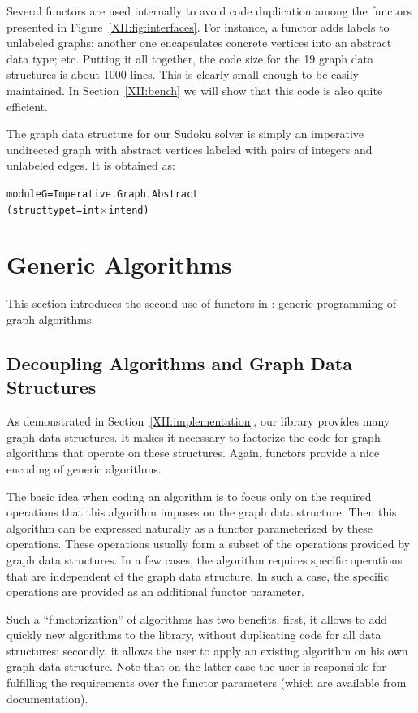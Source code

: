 Several functors are used internally to avoid code duplication among the
functors presented in Figure~\ref{XII:fig:interfaces}. For instance, a
functor adds labels to 
unlabeled graphs; another one encapsulates concrete vertices into an
abstract data type; etc.  Putting it all together, the code size for
the 19 graph data structures is about 1000 lines. This is clearly
small enough to be easily maintained. In Section~\ref{XII:bench} we will
show that this code is also quite efficient.

The graph data structure for our Sudoku solver is simply an imperative
undirected graph with abstract vertices labeled with pairs of integers
and unlabeled edges. It is obtained as:
\begin{alltt}
module G = Imperative.Graph.Abstract
             (struct type t = int \ensuremath{\times} int end) 
\end{alltt}

\section{Generic Algorithms}\label{XII:algos}

This section introduces the second use of functors in \ocamlgraph:
generic programming of graph algorithms.

\subsection{Decoupling Algorithms and Graph Data Structures}

As demonstrated in Section~\ref{XII:implementation}, our library provides
many graph data structures. It makes it necessary to factorize the
code for graph algorithms that operate on these structures. Again,
functors provide a nice encoding of generic algorithms.

The basic idea when coding an algorithm is to focus only on the
required operations that this algorithm imposes on the graph data
structure. Then this algorithm can be expressed naturally as a functor
parameterized by these operations. These operations usually form a
subset of the operations provided by \ocamlgraph graph data
structures. In a few cases, the algorithm requires specific operations
that are independent of the graph data structure. In such a case, the
specific operations are provided as an additional functor parameter.

Such a ``functorization'' of algorithms has two benefits: first, it
allows to add quickly new algorithms to the library, without
duplicating code for all data structures; secondly, it allows the user to
apply an existing algorithm on his own graph data structure.
Note that on the latter case the user is responsible for fulfilling
the requirements over the functor parameters (which are available from
\ocamlgraph documentation).

